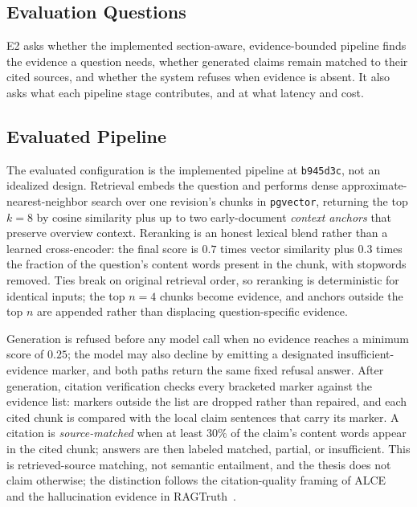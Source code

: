 \subsection{Evaluation Questions}

E2 asks whether the implemented section-aware, evidence-bounded pipeline finds the evidence a question needs, whether generated claims remain matched to their cited sources, and whether the system refuses when evidence is absent.
It also asks what each pipeline stage contributes, and at what latency and cost.

\subsection{Evaluated Pipeline}

The evaluated configuration is the implemented pipeline at \texttt{b945d3c}, not an idealized design.
Retrieval embeds the question and performs dense approximate-nearest-neighbor search over one revision's chunks in \texttt{pgvector}, returning the top \(k=8\) by cosine similarity plus up to two early-document \emph{context anchors} that preserve overview context.
Reranking is an honest lexical blend rather than a learned cross-encoder: the final score is \(0.7\) times vector similarity plus \(0.3\) times the fraction of the question's content words present in the chunk, with stopwords removed.
Ties break on original retrieval order, so reranking is deterministic for identical inputs; the top \(n=4\) chunks become evidence, and anchors outside the top \(n\) are appended rather than displacing question-specific evidence.

Generation is refused before any model call when no evidence reaches a minimum score of \(0.25\); the model may also decline by emitting a designated insufficient-evidence marker, and both paths return the same fixed refusal answer.
After generation, citation verification checks every bracketed marker against the evidence list: markers outside the list are dropped rather than repaired, and each cited chunk is compared with the local claim sentences that carry its marker.
A citation is \emph{source-matched} when at least \(30\%\) of the claim's content words appear in the cited chunk; answers are then labeled matched, partial, or insufficient.
This is retrieved-source matching, not semantic entailment, and the thesis does not claim otherwise; the distinction follows the citation-quality framing of ALCE~\cite{gao2023alce} and the hallucination evidence in RAGTruth~\cite{niu2024ragtruth}.

